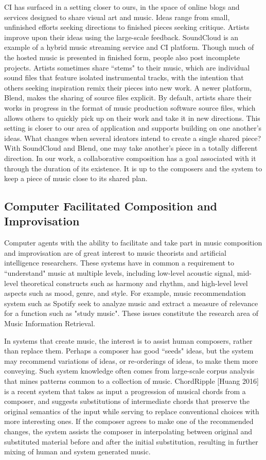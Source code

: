 \documentclass[final,authoryear,11pt,times]{elsarticle}
\begin{document}
CI has surfaced in a setting closer to ours, in the space of online blogs and services designed to share visual art and music. Ideas range from small, unfinished efforts seeking directions to finished pieces seeking critique. Artists improve upon their ideas using the large-scale feedback. SoundCloud is an example of a hybrid music streaming service and CI platform. Though much of the hosted music is presented in finished form, people also post incomplete projects. Artists sometimes share ``stems" to their music, which are individual sound files that feature isolated instrumental tracks, with the intention that others seeking inspiration remix their pieces into new work. A newer platform, Blend, makes the sharing of source files explicit. By default, artists share their works in progress in the format of music production software source files, which allows others to quickly pick up on their work and take it in new directions. This setting is closer to our area of application and supports building on one another's ideas.  What changes when several ideators intend to create a single shared piece? With SoundCloud and Blend, one may take another's piece in a totally different direction. In our work, a collaborative composition has a goal associated with it through the duration of its existence. It is up to the composers and the system to keep a piece of music close to its shared plan.

\subsection{Computer Facilitated Composition and Improvisation}

Computer agents with the ability to facilitate and take part in music composition and improvisation are of great interest to music theorists and artificial intelligence researchers. These systems have in common a requirement to ``understand" music at multiple levels, including low-level acoustic signal, mid-level theoretical constructs such as harmony and rhythm, and high-level level aspects such as mood, genre, and style. For example, music recommendation system such as Spotify seek to analyze music and extract a measure of relevance for a function such as "study music". These issues constitute the research area of Music Information Retrieval.

In systems that create music, the interest is to assist human composers, rather than replace them. Perhaps a composer has good ``seeds" ideas, but the system may recommend variations of ideas, or re-orderings of ideas, to make them more conveying. Such system knowledge often comes from large-scale corpus analysis that mines patterns common to a collection of music. ChordRipple [Huang 2016] is a recent system that takes as input a progression of musical chords from a composer, and suggests substitutions of intermediate chords that preserve the original semantics of the input while serving to replace conventional choices with more interesting ones. If the composer agrees to make one of the recommended changes, the system assists the composer in interpolating between original and substituted material before and after the initial substitution, resulting in further mixing of human and system generated music.
\end{document}
